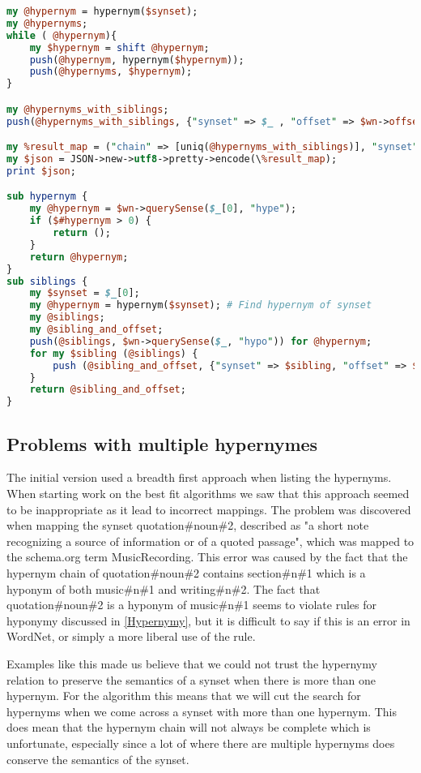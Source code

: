 \begin{lstlisting}[language=perl, label=HypernymChainCode, caption={Excerpt from the hypernym chain perl script}]
my @hypernym = hypernym($synset);
my @hypernyms;
while ( @hypernym){
	my $hypernym = shift @hypernym;
	push(@hypernym, hypernym($hypernym));
	push(@hypernyms, $hypernym);
}

my @hypernyms_with_siblings;
push(@hypernyms_with_siblings, {"synset" => $_ , "offset" => $wn->offset($_) ,"siblings" => [siblings($_)]}) for @hypernyms;

my %result_map = ("chain" => [uniq(@hypernyms_with_siblings)], "synset" => $synset, "offset"=> $wn->offset($synset), "siblings" => [siblings($synset)]);
my $json = JSON->new->utf8->pretty->encode(\%result_map);
print $json;

sub hypernym {
	my @hypernym = $wn->querySense($_[0], "hype");
	if ($#hypernym > 0) {
		return ();
	}
	return @hypernym;
}
sub siblings {
	my $synset = $_[0];
	my @hypernym = hypernym($synset); # Find hypernym of synset
	my @siblings;
	my @sibling_and_offset;
	push(@siblings, $wn->querySense($_, "hypo")) for @hypernym;
	for my $sibling (@siblings) {
		push (@sibling_and_offset, {"synset" => $sibling, "offset" => $wn->offset($sibling)});
	}
	return @sibling_and_offset;
}
\end{lstlisting}

\subsection{Problems with multiple hypernymes}
The initial version used a breadth first approach when listing the hypernyms.
When starting work on the best fit algorithms we saw that this approach seemed to be inappropriate as it lead to incorrect mappings.
The problem was discovered when mapping the synset quotation\#noun\#2,
described as "a short note recognizing a source of information or of a quoted passage",
which was mapped to the schema.org term MusicRecording.
This error was caused by the fact that the hypernym chain of quotation\#noun\#2 contains
section\#n\#1 which is a hyponym of both music\#n\#1 and writing\#n\#2.
The fact that quotation\#noun\#2 is a hyponym of music\#n\#1 seems to violate rules for hyponymy discussed in \ref{Hypernymy},
but it is difficult to say if this is an error in WordNet, or simply a more liberal use of the rule.

Examples like this made us believe that we could not trust the hypernymy relation to preserve the semantics of a
synset when there is more than one hypernym.
For the algorithm this means that we will cut the search for hypernyms when we come across a synset with more than one hypernym.
This does mean that the hypernym chain will not always be complete which is unfortunate,
especially since a lot of where there are multiple hypernyms does conserve the semantics of the synset.

